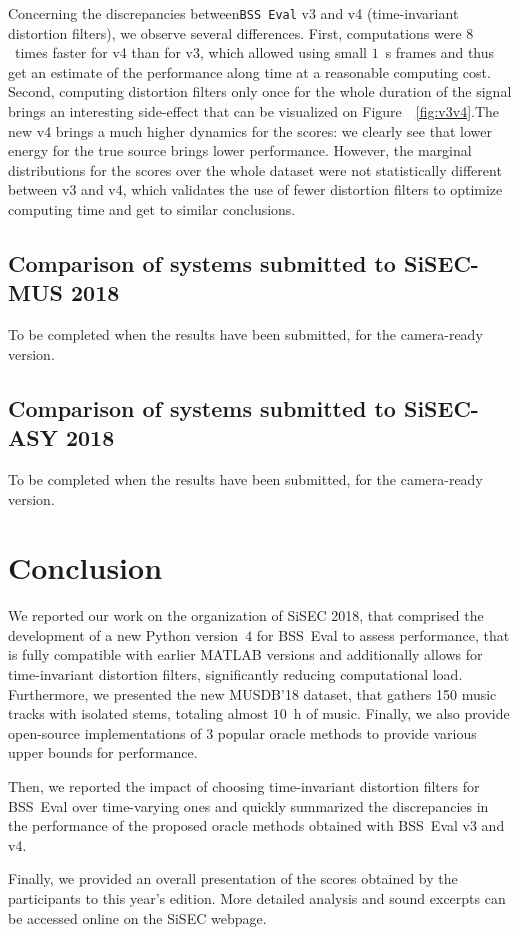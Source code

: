 \documentclass{llncs}
\begin{document}
Concerning the discrepancies between\texttt{BSS~Eval} v3 and v4 (time-invariant distortion filters), we observe several differences. First, computations were $8$~times faster for v4 than for v3, which allowed using small $1$~s frames and thus get an estimate of the performance along time at a reasonable computing cost. Second, computing distortion filters only once for the whole duration of the signal brings an interesting side-effect that can be visualized on Figure~~\ref{fig:v3v4}.The new v4 brings a much higher dynamics for the scores: we clearly see that lower energy for the true source brings lower performance. However, the marginal distributions for the scores over the whole dataset were not statistically different between v3 and v4, which validates the use of fewer distortion filters to optimize computing time and get to similar conclusions.



\subsection{Comparison of systems submitted to SiSEC-MUS 2018}
To be completed when the results have been submitted, for the camera-ready version.
\subsection{Comparison of systems submitted to SiSEC-ASY 2018}
To be completed when the results have been submitted, for the camera-ready version.

\section{Conclusion}
\label{sec:concl}
\vspace{-2mm}
We reported our work on the organization of SiSEC 2018, that comprised the development of a new Python version~$4$ for BSS~Eval to assess performance, that is fully compatible with earlier MATLAB versions and additionally allows for time-invariant distortion filters, significantly reducing computational load. Furthermore, we presented the new MUSDB'18 dataset, that gathers 150 music tracks with isolated stems, totaling almost $10$~h of music. Finally, we also provide open-source implementations of $3$ popular oracle methods to provide various upper bounds for performance.

Then, we reported the impact of choosing time-invariant distortion filters for BSS~Eval over time-varying ones and quickly summarized the discrepancies in the performance of the proposed oracle methods obtained with BSS~Eval v3 and v4.

Finally, we provided an overall presentation of the scores obtained by the participants to this year's edition. More detailed analysis and sound excerpts can be accessed online on the SiSEC webpage.
\footnotesize


\end{document}
